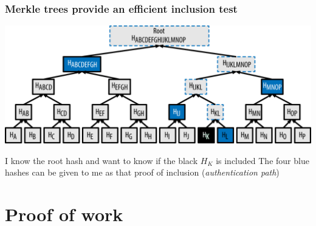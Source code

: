 \documentclass[11pt]{beamer}  %
\begin{document}
\begin{frame}\frametitle{Merkle trees provide an efficient inclusion test}

  \begin{center}
    \includegraphics[width=\textwidth,clip=false]{pictures/mbc2_0905.png}
  \end{center}

  \begin{greenbox}{I know the root hash and want to know if the {\color{black}black $H_K$} is included}
    The {\color{blue}four blue hashes} can be given to me as that proof of inclusion
    (\emph{authentication path})
  \end{greenbox}

\end{frame}

\section{Proof of work}
\end{document}
